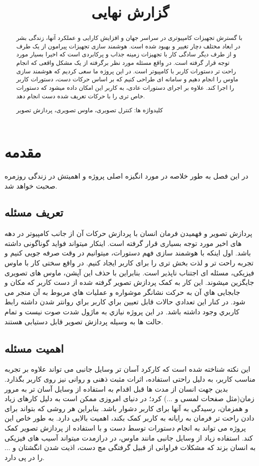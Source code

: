 \documentclass{article}
\title{گزارش نهایی}
\begin{document}
\heading
\header
\allowdisplaybreaks
\begin{abstract}
با گسترش تجهیزات کامپیوتری در سراسر جهان و افزایش کارایی و عملکرد آنها، زندگی بشر در ابعاد مختلف دچار تغییر و بهبود شده است. هوشمند سازی تجهیزات پیرامون از یک طرف و از طرف دیگر سادگی کار با تجهیزات زمینه جذاب و پرکابردی است که اخیرا بسیار مورد توجه قرار گرفته است. در واقع مسئله مورد نظر برگرفته از یک مشکل واقعی که انجام راحت تر دستورات کاربر با کامپیوتر است. در این پروژه ما سعی کردیم که هوشمند سازی ماوس را انجام دهیم و سامانه ای طراحی کنیم که بر اساس حرکات دست، دستورات کاربر را اجرا کند. علاوه بر اجرای دستورات عادی، به کاربر این امکان داده میشود که دستورات خاص تری را با حرکات تعریف شده دست انجام دهد. 

کلیدواژه ها: کنترل تصویری، ماوس تصویری، پردازش تصویر
\end{abstract}
\pagebreak
\tableofcontents
\pagebreak

\section{مقدمه}
در این فصل به طور خلاصه در مورد انگیزه اصلی پروژه و اهمیتش در زندگی روزمره صحبت خواهد شد.

\subsection{تعریف مسئله}
پردازش تصویر و فهمیدن فرمان انسان با پردازش حرکات آن از جانب کامپیوتر در دهه های اخیر مورد توجه بسیاری قرار گرفته است. اینکار میتواند فواید گوناگونی داشته باشد. اول اینکه با هوشمند سازی فهم دستورات، میتوانیم در وقت صرفه جویی کنیم و تجربه راحت تر و لذت بخش تری را برای کاربر ایجاد کنیم. در واقع سختی کار با ماوس فیزیکی، مسئله ای اجتناب ناپذیر است. بنابراین با حذف این آپشن، ماوس های تصویری جایگزین میشوند. این کار به کمک پردازش تصویر گرفته شده از دست کاربر که مکان و جابجایی هاي آن به حرکت نشانگر موشواره و عملیات هاي مربوط به آن منجر می شود. در کنار این تعدادي حالات قابل تعیین براي کاربر براي روانتر شدن داشته رابط کاربري وجود داشته باشد. در این پروژه نیازي به ماژول شدت صوت نیست و تمام حالت ها به وسیله پردازش تصویر قابل دستیابی هستند. 

\subsection{اهمیت مسئله}
این نکته شناخته شده است که کارکرد آسان تر وسایل جانبی می تواند علاوه بر تجربه مناسب کاربر، به دلیل راحتی استفاده، اثرات مثبت ذهنی و روانی نیز روی کاربر بگذارد. بدین جهت انسان از مدت ها قبل اقدام به استفاده از وسایل آسان تر به مرور زمان(مثل صفحات لمسی و ...) کرد؛ در دنیای امروزی ممکن است به دلیل کارهای زیاد و همزمان، رسیدگی به آنها برای کاربر دشوار باشد. بنابراین هر روشی که بتواند برای دادن راحت تر فرمان به رایانه به کاربر کمک بکند، اهمیت بالایی دارد. به طور خاص این پروژه می تواند به انجام دستورات توسط دست و با استفاده از پردازش تصویر کمک کند. استفاده زیاد از وسایل جانبی مانند ماوس، در درازمدت میتواند آسیب های فیزیکی به انسان بزند که مشکلات فراوانی از قبیل گرفتگی مچ دست، اذیت شدن انگشتان و ... را در پی دارد.
\end{document}
